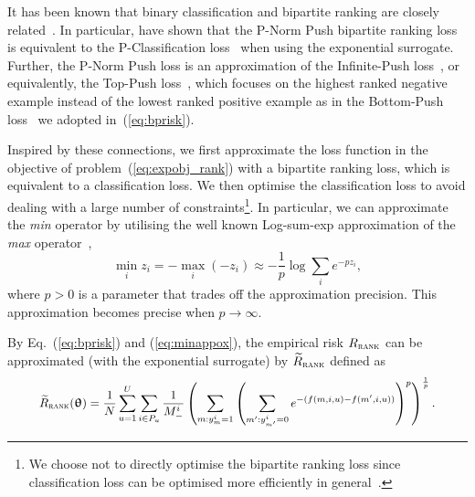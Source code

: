 It has been known that binary classification and bipartite ranking are
closely related~\cite{ertekin2011equivalence,menon2016bipartite}.
In particular, \citet{ertekin2011equivalence} have shown that the P-Norm Push bipartite ranking loss~\cite{rudin2009p}
is equivalent to the P-Classification loss~\cite{ertekin2011equivalence} when using the exponential surrogate.
Further, the P-Norm Push loss is an approximation of the Infinite-Push loss~\cite{agarwal2011infinite},
or equivalently, the Top-Push loss~\cite{li2014top}, which focuses on the highest ranked negative example instead of
the lowest ranked positive example as in the Bottom-Push loss~\cite{rudin2009p} we adopted in~(\ref{eq:bprisk}).

Inspired by these connections, 
we first approximate the loss function in the objective of problem~(\ref{eq:expobj_rank}) with
a bipartite ranking loss, which is equivalent to a classification loss.
We then optimise the classification loss to avoid dealing with a large number of 
constraints\footnote{We choose not to directly optimise the bipartite ranking loss 
since classification loss can be optimised more efficiently in general~\cite{ertekin2011equivalence}.}.
%
In particular, 
we can approximate the \emph{min} operator by utilising the well known Log-sum-exp approximation 
of the \emph{max} operator~\cite[p. 72]{boyd2004convex},
\begin{equation}
\label{eq:minappox}
\min_i z_i = -\max_i (-z_i) \approx -\frac{1}{p} \log \sum_i e^{-p z_i},
\end{equation}
where $p > 0$ is a parameter that trades off the approximation precision.
This approximation becomes precise when $p \to \infty$.

By Eq.~(\ref{eq:bprisk}) and (\ref{eq:minappox}), the empirical risk $R_\textsc{rank}$ can be approximated
(with the exponential surrogate) by $\widetilde R_\textsc{rank}$ defined as
\begin{equation}
\label{eq:rankapprox}
\resizebox{.9\linewidth}{!}{$
\begin{aligned}
\widetilde R_\textsc{rank}(\upthetabm)
= \frac{1}{N} \sum_{u=1}^U \sum_{i \in P_u} \frac{1}{M_-^i} \left( \sum_{m: y_m^i = 1} \left( \sum_{m': y_{m'}^i = 0} 
  e^{-(f(m, i, u) - f(m', i, u))} \right)^p \right)^\frac{1}{p}.
\end{aligned}
$}
\end{equation}



